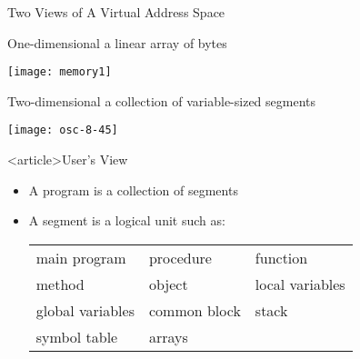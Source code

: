 \begin{frame}{Two Views of A Virtual Address Space}
  \begin{varwidth}{.45\textwidth}
    \begin{iblock}{One-dimensional}
      a linear array of bytes
      \begin{center}
        \texttt{[image: memory1]}
      \end{center}
    \end{iblock}
  \end{varwidth}\hfill
  \begin{varwidth}{.45\textwidth}
    \begin{iblock}{Two-dimensional}
      a collection of variable-sized segments
      \begin{center}
        \texttt{[image: osc-8-45]}
      \end{center}
    \end{iblock}
  \end{varwidth}
\end{frame}

\begin{frame}<article>{User's View}
  \begin{itemize}
  \item A program is a collection of segments
  \item A segment is a logical unit such as:
    \begin{center}
      \begin{small}
        \begin{tabular}{lll}
          main program&procedure&function\\
          method&object&local variables\\
          global variables&common block&stack\\
          symbol table&arrays
        \end{tabular}
      \end{small}
    \end{center}
  \end{itemize}
\end{frame}

